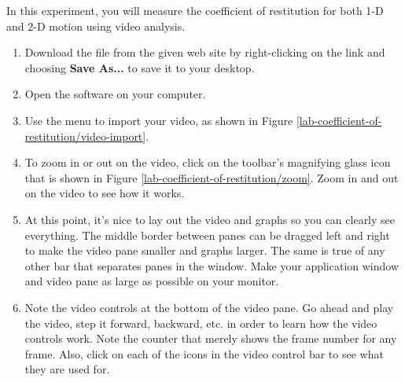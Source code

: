 

\apparatus


\longgoal

In this experiment, you will measure the coefficient of restitution for both 1-D and 2-D motion using video analysis.

\procedure

\begin{enumerate}
	\item Download the file  from the given web site by right-clicking on the link and choosing {\bf Save As...} to save it to your desktop.
	\item Open the  software on your computer.
	\item Use the menu  to import your video, as shown in Figure \ref{lab-coefficient-of-restitution/video-import}.

	
	\item To zoom in or out on the video, click on the toolbar's magnifying glass icon that is shown in Figure \ref{lab-coefficient-of-restitution/zoom}. Zoom in and out on the video to see how it works.
	
	
	\item At this point, it's nice to lay out the video and graphs so you can clearly see everything. The middle border between panes can be dragged left and right to make the video pane smaller and graphs larger. The same is true of any other bar that separates panes in the window. Make your application window and video pane as large as possible on your monitor.
		
	\item Note the video controls at the bottom of the video pane. Go ahead and play the video, step it forward, backward, etc. in order to learn how the video controls work. Note the counter that merely shows the frame number for any frame. Also, click on each of the icons in the video control bar to see what they are used for.


\end{enumerate}
